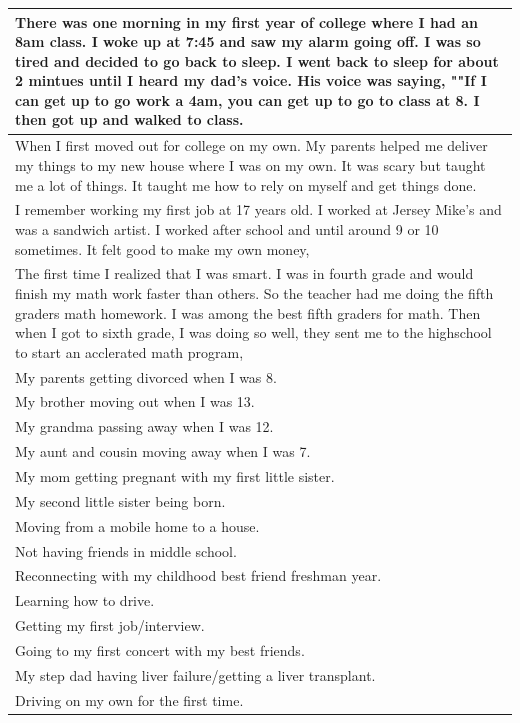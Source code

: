 \documentclass[
  .7em,
  letterpaper,
  DIV=11,
  numbers=noendperiod]{scrartcl}
\begin{document}
\begin{table}
\begin{tabular}{l}
\hline
There was one morning in my first year of college where I had an 8am class. I woke up at 7:45 and saw my alarm going off. I was so tired and decided to go back to sleep. I went back to sleep for about 2 mintues until I heard my dad's voice. His voice was saying, ""If I can get up to go work a 4am, you can get up to go to class at 8. I then got up and walked to class.\\
\hline
When I first moved out for college on my own. My parents helped me deliver my things to my new house where I was on my own. It was scary but taught me a lot of things. It taught me how to rely on myself and get things done.\\
\hline
I remember working my first job at 17 years old. I worked at Jersey Mike's and was a sandwich artist. I worked after school and until around 9 or 10 sometimes. It felt good to make my own money,\\
\hline
The first time I realized that I was smart. I was in fourth grade and would finish my math work faster than others. So the teacher had me doing the fifth graders math homework. I was among the best fifth graders for math. Then when I got to sixth grade, I was doing so well, they sent me to the highschool to start an acclerated math program,\\
\hline
My parents getting divorced when I was 8.\\
\hline
My brother moving out when I was 13.\\
\hline
My grandma passing away when I was 12.\\
\hline
My aunt and cousin moving away when I was 7.\\
\hline
My mom getting pregnant with my first little sister.\\
\hline
My second little sister being born.\\
\hline
Moving from a mobile home to a house.\\
\hline
Not having friends in middle school.\\
\hline
Reconnecting with my childhood best friend freshman year.\\
\hline
Learning how to drive.\\
\hline
Getting my first job/interview.\\
\hline
Going to my first concert with my best friends.\\
\hline
My step dad having liver failure/getting a liver transplant.\\
\hline
Driving on my own for the first time.\\

\end{tabular}
\end{table}
\end{document}
